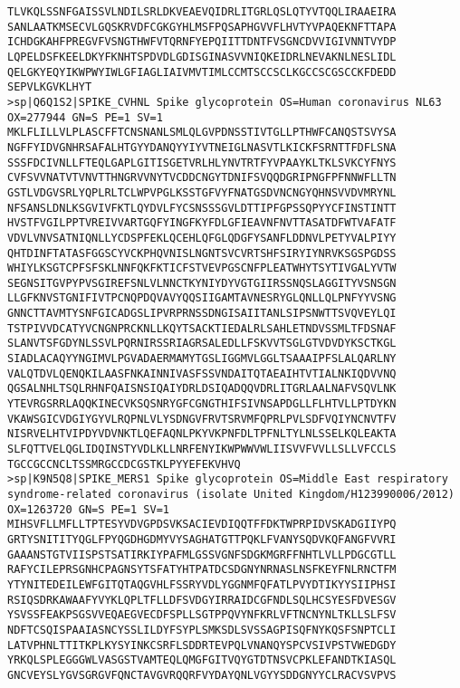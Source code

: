 \begin{lstlisting}
TLVKQLSSNFGAISSVLNDILSRLDKVEAEVQIDRLITGRLQSLQTYVTQQLIRAAEIRA
SANLAATKMSECVLGQSKRVDFCGKGYHLMSFPQSAPHGVVFLHVTYVPAQEKNFTTAPA
ICHDGKAHFPREGVFVSNGTHWFVTQRNFYEPQIITTDNTFVSGNCDVVIGIVNNTVYDP
LQPELDSFKEELDKYFKNHTSPDVDLGDISGINASVVNIQKEIDRLNEVAKNLNESLIDL
QELGKYEQYIKWPWYIWLGFIAGLIAIVMVTIMLCCMTSCCSCLKGCCSCGSCCKFDEDD
SEPVLKGVKLHYT
>sp|Q6Q1S2|SPIKE_CVHNL Spike glycoprotein OS=Human coronavirus NL63 OX=277944 GN=S PE=1 SV=1
MKLFLILLVLPLASCFFTCNSNANLSMLQLGVPDNSSTIVTGLLPTHWFCANQSTSVYSA
NGFFYIDVGNHRSAFALHTGYYDANQYYIYVTNEIGLNASVTLKICKFSRNTTFDFLSNA
SSSFDCIVNLLFTEQLGAPLGITISGETVRLHLYNVTRTFYVPAAYKLTKLSVKCYFNYS
CVFSVVNATVTVNVTTHNGRVVNYTVCDDCNGYTDNIFSVQQDGRIPNGFPFNNWFLLTN
GSTLVDGVSRLYQPLRLTCLWPVPGLKSSTGFVYFNATGSDVNCNGYQHNSVVDVMRYNL
NFSANSLDNLKSGVIVFKTLQYDVLFYCSNSSSGVLDTTIPFGPSSQPYYCFINSTINTT
HVSTFVGILPPTVREIVVARTGQFYINGFKYFDLGFIEAVNFNVTTASATDFWTVAFATF
VDVLVNVSATNIQNLLYCDSPFEKLQCEHLQFGLQDGFYSANFLDDNVLPETYVALPIYY
QHTDINFTATASFGGSCYVCKPHQVNISLNGNTSVCVRTSHFSIRYIYNRVKSGSPGDSS
WHIYLKSGTCPFSFSKLNNFQKFKTICFSTVEVPGSCNFPLEATWHYTSYTIVGALYVTW
SEGNSITGVPYPVSGIREFSNLVLNNCTKYNIYDYVGTGIIRSSNQSLAGGITYVSNSGN
LLGFKNVSTGNIFIVTPCNQPDQVAVYQQSIIGAMTAVNESRYGLQNLLQLPNFYYVSNG
GNNCTTAVMTYSNFGICADGSLIPVRPRNSSDNGISAIITANLSIPSNWTTSVQVEYLQI
TSTPIVVDCATYVCNGNPRCKNLLKQYTSACKTIEDALRLSAHLETNDVSSMLTFDSNAF
SLANVTSFGDYNLSSVLPQRNIRSSRIAGRSALEDLLFSKVVTSGLGTVDVDYKSCTKGL
SIADLACAQYYNGIMVLPGVADAERMAMYTGSLIGGMVLGGLTSAAAIPFSLALQARLNY
VALQTDVLQENQKILAASFNKAINNIVASFSSVNDAITQTAEAIHTVTIALNKIQDVVNQ
QGSALNHLTSQLRHNFQAISNSIQAIYDRLDSIQADQQVDRLITGRLAALNAFVSQVLNK
YTEVRGSRRLAQQKINECVKSQSNRYGFCGNGTHIFSIVNSAPDGLLFLHTVLLPTDYKN
VKAWSGICVDGIYGYVLRQPNLVLYSDNGVFRVTSRVMFQPRLPVLSDFVQIYNCNVTFV
NISRVELHTVIPDYVDVNKTLQEFAQNLPKYVKPNFDLTPFNLTYLNLSSELKQLEAKTA
SLFQTTVELQGLIDQINSTYVDLKLLNRFENYIKWPWWVWLIISVVFVVLLSLLVFCCLS
TGCCGCCNCLTSSMRGCCDCGSTKLPYYEFEKVHVQ
>sp|K9N5Q8|SPIKE_MERS1 Spike glycoprotein OS=Middle East respiratory syndrome-related coronavirus (isolate United Kingdom/H123990006/2012) OX=1263720 GN=S PE=1 SV=1
MIHSVFLLMFLLTPTESYVDVGPDSVKSACIEVDIQQTFFDKTWPRPIDVSKADGIIYPQ
GRTYSNITITYQGLFPYQGDHGDMYVYSAGHATGTTPQKLFVANYSQDVKQFANGFVVRI
GAAANSTGTVIISPSTSATIRKIYPAFMLGSSVGNFSDGKMGRFFNHTLVLLPDGCGTLL
RAFYCILEPRSGNHCPAGNSYTSFATYHTPATDCSDGNYNRNASLNSFKEYFNLRNCTFM
YTYNITEDEILEWFGITQTAQGVHLFSSRYVDLYGGNMFQFATLPVYDTIKYYSIIPHSI
RSIQSDRKAWAAFYVYKLQPLTFLLDFSVDGYIRRAIDCGFNDLSQLHCSYESFDVESGV
YSVSSFEAKPSGSVVEQAEGVECDFSPLLSGTPPQVYNFKRLVFTNCNYNLTKLLSLFSV
NDFTCSQISPAAIASNCYSSLILDYFSYPLSMKSDLSVSSAGPISQFNYKQSFSNPTCLI
LATVPHNLTTITKPLKYSYINKCSRFLSDDRTEVPQLVNANQYSPCVSIVPSTVWEDGDY
YRKQLSPLEGGGWLVASGSTVAMTEQLQMGFGITVQYGTDTNSVCPKLEFANDTKIASQL
GNCVEYSLYGVSGRGVFQNCTAVGVRQQRFVYDAYQNLVGYYSDDGNYYCLRACVSVPVS

\end{lstlisting}
